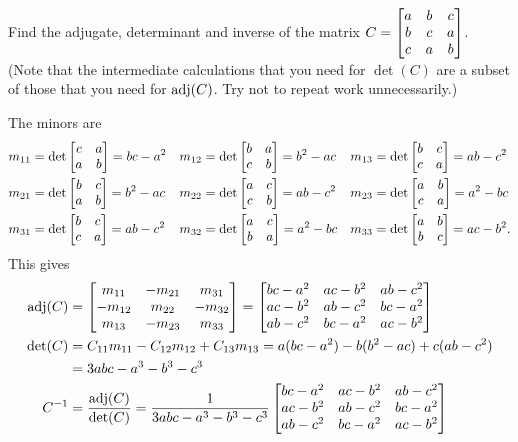 \documentclass[a4paper]{amsart}
\renewenvironment{solution}{\SolutionInline}{\endSolutionInline}
\begin{document}
\begin{exercise}\label{ex-adjugate-circulant}
 Find the adjugate, determinant and inverse of the matrix
 $C=\left[\begin{matrix} a & b & c \\
         b & c & a \\
         c & a & b \end{matrix}\right]$.  \\
 (Note that the intermediate calculations that you need for $\det(C)$
 are a subset of those that you need for $\operatorname{adj}(C)$.  Try not to repeat
 work unnecessarily.)
\end{exercise}
\begin{solution}
 The minors are 
 \begin{align*}
  m_{11} &= \det\left[\begin{matrix} c & a \\ a & b \end{matrix}\right] = bc-a^2 &
  m_{12} &= \det\left[\begin{matrix} b & a \\ c & b \end{matrix}\right] = b^2-ac &
  m_{13} &= \det\left[\begin{matrix} b & c \\ c & a \end{matrix}\right] = ab-c^2 \\
  m_{21} &= \det\left[\begin{matrix} b & c \\ a & b \end{matrix}\right] = b^2-ac &
  m_{22} &= \det\left[\begin{matrix} a & c \\ c & b \end{matrix}\right] = ab-c^2 &
  m_{23} &= \det\left[\begin{matrix} a & b \\ c & a \end{matrix}\right] = a^2-bc \\
  m_{31} &= \det\left[\begin{matrix} b & c \\ c & a \end{matrix}\right] = ab-c^2 &
  m_{32} &= \det\left[\begin{matrix} a & c \\ b & a \end{matrix}\right] = a^2-bc &
  m_{33} &= \det\left[\begin{matrix} a & b \\ b & c \end{matrix}\right] = ac-b^2. 
 \end{align*}
 This gives
 \begin{align*} 
  \operatorname{adj}(C) &= \left[\begin{matrix}  m_{11} & -m_{21} &  m_{31} \\
                  -m_{12} &  m_{22} & -m_{32} \\
                   m_{13} & -m_{23} &  m_{33} \end{matrix}\right] 
           = \left[\begin{matrix}  bc-a^2 & ac-b^2 & ab-c^2 \\
                   ac-b^2 & ab-c^2 & bc-a^2 \\
                   ab-c^2 & bc-a^2 & ac-b^2 \end{matrix}\right]
                   \\
  \det(C) &= C_{11}m_{11} - C_{12}m_{12} + C_{13}m_{13} 
           = a(bc-a^2) - b(b^2-ac) + c(ab-c^2) \\
          &= 3abc-a^3-b^3-c^3 \\
  C^{-1}  &= \frac{\operatorname{adj}(C)}{\det(C)} 
           = \frac{1}{3abc-a^3-b^3-c^3}
             \left[\begin{matrix}  bc-a^2 & ac-b^2 & ab-c^2 \\
                   ac-b^2 & ab-c^2 & bc-a^2 \\
                   ab-c^2 & bc-a^2 & ac-b^2 \end{matrix}\right]
 \end{align*}
\end{solution}
\end{document}
